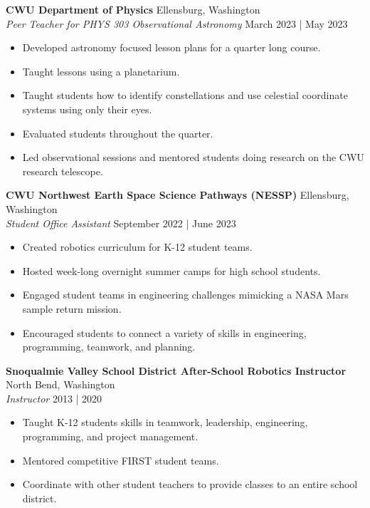 \documentclass[a4paper,9pt]{extarticle}
\begin{document}
\noindent\textbf{CWU Department of Physics} \hfill Ellensburg, Washington\\
\textit{Peer Teacher for PHYS 303 Observational Astronomy} \hfill March 2023 | May 2023
\begin{itemize}
    \item Developed astronomy focused lesson plans for a quarter long course.
    \item Taught lessons using a planetarium.
    \item Taught students how to identify constellations and use celestial coordinate systems using only their eyes.
    \item Evaluated students throughout the quarter.
    \item Led observational sessions and mentored students doing research on the CWU research telescope.
\end{itemize}

\noindent\textbf{CWU Northwest Earth Space Science Pathways (NESSP)} \hfill Ellensburg, Washington\\
\textit{Student Office Assistant} \hfill September 2022 | June 2023
\begin{itemize}
    \item Created robotics curriculum for K-12 student teams.
    \item Hosted week-long overnight summer camps for high school students.
    \item Engaged student teams in engineering challenges mimicking a NASA Mars sample return mission.
    \item Encouraged students to connect a variety of skills in engineering, programming, teamwork, and planning.
\end{itemize}

\noindent\textbf{Snoqualmie Valley School District After-School Robotics Instructor} \hfill North Bend, Washington\\
\textit{Instructor} \hfill 2013 | 2020
\begin{itemize}
    \item Taught K-12 students skills in teamwork, leadership, engineering, programming, and project management.
    \item Mentored competitive FIRST student teams.
    \item Coordinate with other student teachers to provide classes to an entire school district.
\end{itemize}
\end{document}
